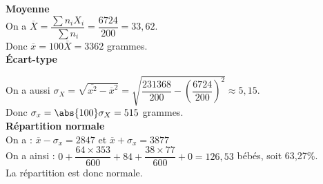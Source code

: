 \vspace*{.3cm}

\textbf{Moyenne} \\

On a $\overline{X} = \dfrac{\displaystyle{\sum n_iX_i}}{\displaystyle{\sum n_i}} = \dfrac{6724}{200} = 33,62. $ \\

Donc $\overline{x} = 100\overline{X} = 3362$ grammes. \\

\textbf{Écart-type} 

On a aussi $\sigma_X = \sqrt{\overline{x^2} - \overline{x}^2} = \sqrt{\dfrac{231368}{200} - \left(\dfrac{6724}{200}\right)^2} \approx 5,15$. \\

Donc $ \sigma_x = \abs{100}\sigma_X = 515$ grammes.  \\

\textbf{Répartition normale} \\

On a : $\overline{x} - \sigma_x = 2847$ et $\overline{x} + \sigma_x = 3877$ \\

On a ainsi : $ 0 + \dfrac{64 \times 353}{600} + 84 + \dfrac{38 \times 77}{600} + 0 = 126,53$ bébés, soit 63,27\%. \\

La répartition est donc normale.


\ifdefined\COMPLETE
\else
    
\fi